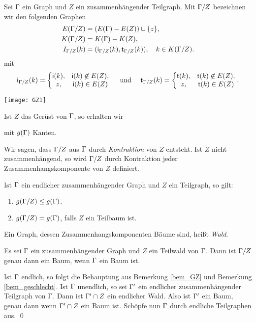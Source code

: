 \DB Sei $\Gamma$ ein Graph und $Z$ ein zusammenhängender Teilgraph.
Mit $\Gamma/Z$ bezeichnen
wir den folgenden Graphen
\begin{align*}
E(\Gamma/Z) &= ( E(\Gamma)-E(Z) )\cup\{z\},\\
K(\Gamma/Z) &= K(\Gamma)-K(Z),\\
I_{\Gamma/Z}(k) &= (\mathsf{i}_{\Gamma/Z}(k),\mathsf{t}_{\Gamma/Z}(k)), \quad k\in K(\Gamma/Z).
\end{align*}
mit
\[
\mathsf{i}_{\Gamma/Z}(k) =
\left\{\begin{matrix}
\mathsf{i}(k), & \mathsf{i}(k)\not\in E(Z),\\
z, & \mathsf{i}(k)\in E(Z)
\end{matrix}\right.
\quad
\text{ und }
\quad
\mathsf{t}_{\Gamma/Z}(k) =
\left\{\begin{matrix}
\mathsf{t}(k), & \mathsf{t}(k)\not\in E(Z),\\
z, & \mathsf{t}(k)\in E(Z)
\end{matrix}\right.
.
\]
\begin{center}
	\texttt{[image: GZ1]}
\end{center}

\BSP Ist $Z$ das Gerüst von $\Gamma$, so erhalten wir
\begin{center}
\end{center}
mit $g(\Gamma)$ Kanten.

\DEF
Wir sagen, dass $\Gamma/Z$ aus $\Gamma$ durch \emph{Kontraktion}
von $Z$ entsteht.
Ist $Z$ nicht zusammenhängend, so wird $\Gamma/Z$ durch Kontraktion
jeder Zusammen\-hangskomponente von $Z$ definiert.

\BEM \label{bem_GZ}
Ist $\Gamma$ ein endlicher zusammenhängender Graph und $Z$ ein
Teilgraph, so gilt:
\begin{enumerate}
\item $g(\Gamma/Z) \leq g(\Gamma)$.
\item $g(\Gamma/Z) = g(\Gamma)$, falls $Z$ ein Teilbaum ist.
\end{enumerate}

\DEF Ein Graph, dessen Zusammenhangskomponenten Bäume sind,
heißt \emph{Wald}.

\BEM Es sei $\Gamma$ ein zusammenhängender Graph und $Z$ ein Teilwald
von $\Gamma$. Dann ist $\Gamma/Z$ genau dann ein Baum, wenn $\Gamma$ ein
Baum ist.

\bew Ist $\Gamma$ endlich, so folgt die Behauptung aus Bemerkung
\ref{bem_GZ} und Bemerkung \ref{bem_geschlecht}.
Ist $\Gamma$ unendlich, so sei $\Gamma'$ ein endlicher zusammenhängender
Teilgraph von $\Gamma$. Dann ist $\Gamma'\cap Z$ ein endlicher Wald.
Also ist $\Gamma'$ ein Baum, genau dann wenn $\Gamma'\cap Z$ ein Baum
ist. Schöpfe nun $\Gamma$ durch endliche Teilgraphen aus.
\qed

